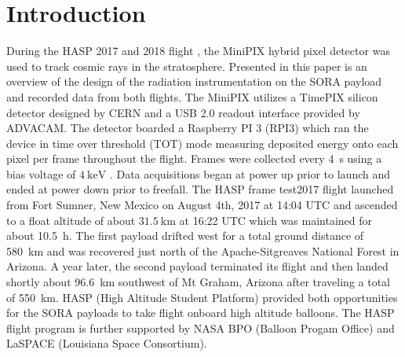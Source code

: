 \section{Introduction}
\label{Introduction}

During the HASP 2017 and 2018 flight \cite{hasp} , the MiniPIX hybrid pixel detector\cite{minipix} was used to track cosmic rays in the stratosphere. 
%
Presented in this paper is an overview of the design of the radiation instrumentation on the SORA payload and recorded data from both flights.
%
The MiniPIX utilizes a TimePIX\cite{timepix} silicon detector designed by CERN\cite{cern} and a USB 2.0 readout interface provided by ADVACAM\cite{advacam}. 
%
The detector boarded a Raspberry PI 3 (RPI3) which ran the device in time over threshold (TOT) mode measuring deposited energy onto each pixel per frame throughout the flight. 
%
Frames were collected every \SI{4}{\second} using a bias voltage of $\SI{4}{\kilo\electronvolt}$ . 
%
Data acquisitions began at power up prior to launch and ended at power down prior to freefall. 
%
The HASP frame test2017 flight launched from Fort Sumner, New Mexico on August 4th, 2017 at 14:04 UTC and ascended to a float altitude of about $\SI{31.5}{\kilo\meter}$ at 16:22 UTC which was maintained for about \SI{10.5}{\hour}.
%
 The first payload drifted west for a total ground distance of \SI{580}{\kilo\meter} and was recovered just north of the Apache-Sitgreaves National Forest in Arizona. 
 A year later, the second payload terminated its flight and then landed shortly about \SI{96.6}{\kilo\meter} southwest of Mt Graham, Arizona after traveling a total of \SI{550}{\kilo\meter}.
 HASP (High Altitude Student Platform) provided both opportunities for the SORA payloads to take flight onboard high altitude balloons. The HASP flight program is further supported by NASA BPO (Balloon Progam Office) and LaSPACE (Louisiana Space Consortium).
